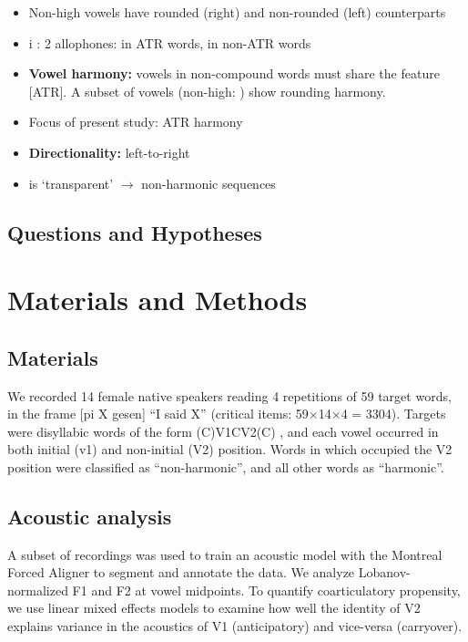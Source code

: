 \documentclass[a4paper,11pt,twocolumn]{article}
\newcommand{\nt}[1]{\textipa{[#1]}} %
\newcommand{\wt}[1]{\textipa{/#1/}} %
\begin{document}
\begin{itemize}
	\item Non-high vowels have rounded (right) and non-rounded (left) counterparts
	\item i : 2 allophones: \nt{i} in ATR words, \nt{I} in non-ATR words
\end{itemize}


\begin{itemize} 
	\item \textbf{Vowel harmony:} vowels in non-compound words must share the feature [ATR]. A subset of vowels (non-high: ) show rounding harmony.
	\item Focus of present study: ATR harmony
	\item \textbf{Directionality:} left-to-right
	\item \nt{i} is `transparent' $\rightarrow$ non-harmonic sequences
	
\end{itemize}


\subsection{Questions and Hypotheses}

\section{Materials and Methods}

\subsection{Materials}
We recorded 14 female native speakers reading 4 repetitions of 59 target words, in the frame [pi X gesen] ``I said X'' (critical items: 59$\times$14$\times$4 = 3304). Targets were disyllabic words of the form (C)V1CV2(C) \cite{svantesson2005}, and each vowel occurred in both initial (v1) and non-initial (V2) position. Words in which \wt{i} occupied the V2 position were classified as ``non-harmonic'', and all other words as ``harmonic''.

\subsection{Acoustic analysis}
A subset of recordings was used to train an acoustic model with the Montreal Forced Aligner \cite{mcauliffe2017montreal} to segment and annotate the data. We analyze Lobanov-normalized F1 and F2 at vowel midpoints. To quantify coarticulatory propensity, we use linear mixed effects models to examine how well the identity of V2 explains variance in the acoustics of V1 (anticipatory) and vice-versa (carryover).
\end{document}
